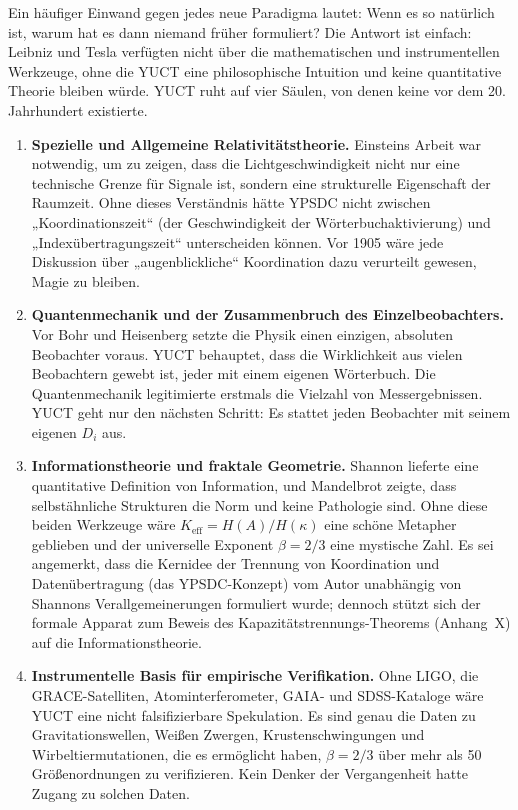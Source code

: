 \documentclass[12pt,a4paper]{article}
\begin{document}
	Ein häufiger Einwand gegen jedes neue Paradigma lautet: Wenn es so natürlich ist, warum hat es dann niemand früher formuliert? Die Antwort ist einfach: Leibniz und Tesla verfügten nicht über die mathematischen und instrumentellen Werkzeuge, ohne die YUCT eine philosophische Intuition und keine quantitative Theorie bleiben würde. YUCT ruht auf vier Säulen, von denen keine vor dem 20. Jahrhundert existierte.
	
	\begin{enumerate}[leftmargin=*, label=\textbf{\arabic*.}]
		\item \textbf{Spezielle und Allgemeine Relativitätstheorie.} Einsteins Arbeit war notwendig, um zu zeigen, dass die Lichtgeschwindigkeit nicht nur eine technische Grenze für Signale ist, sondern eine strukturelle Eigenschaft der Raumzeit. Ohne dieses Verständnis hätte YPSDC nicht zwischen „Koordinationszeit“ (der Geschwindigkeit der Wörterbuchaktivierung) und „Indexübertragungszeit“ unterscheiden können. Vor 1905 wäre jede Diskussion über „augenblickliche“ Koordination dazu verurteilt gewesen, Magie zu bleiben.
		
		\item \textbf{Quantenmechanik und der Zusammenbruch des Einzelbeobachters.} Vor Bohr und Heisenberg setzte die Physik einen einzigen, absoluten Beobachter voraus. YUCT behauptet, dass die Wirklichkeit aus vielen Beobachtern gewebt ist, jeder mit einem eigenen Wörterbuch. Die Quantenmechanik legitimierte erstmals die Vielzahl von Messergebnissen. YUCT geht nur den nächsten Schritt: Es stattet jeden Beobachter mit seinem eigenen \(D_i\) aus.
		
		\item \textbf{Informationstheorie und fraktale Geometrie.} Shannon lieferte eine quantitative Definition von Information, und Mandelbrot zeigte, dass selbstähnliche Strukturen die Norm und keine Pathologie sind. Ohne diese beiden Werkzeuge wäre \(K_{\mathrm{eff}} = H(A)/H(\kappa)\) eine schöne Metapher geblieben und der universelle Exponent \(\beta=2/3\) eine mystische Zahl. Es sei angemerkt, dass die Kernidee der Trennung von Koordination und Datenübertragung (das YPSDC-Konzept) vom Autor unabhängig von Shannons Verallgemeinerungen formuliert wurde; dennoch stützt sich der formale Apparat zum Beweis des Kapazitätstrennungs-Theorems (Anhang~X) auf die Informationstheorie.
		
		\item \textbf{Instrumentelle Basis für empirische Verifikation.} Ohne LIGO, die GRACE-Satelliten, Atominterferometer, GAIA- und SDSS-Kataloge wäre YUCT eine nicht falsifizierbare Spekulation. Es sind genau die Daten zu Gravitationswellen, Weißen Zwergen, Krustenschwingungen und Wirbeltiermutationen, die es ermöglicht haben, \(\beta=2/3\) über mehr als 50 Größenordnungen zu verifizieren. Kein Denker der Vergangenheit hatte Zugang zu solchen Daten.
	\end{enumerate}
	
\end{document}
